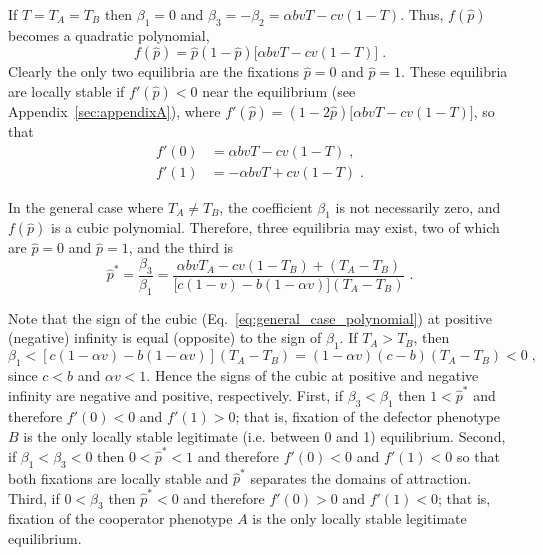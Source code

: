\documentclass[12pt]{extarticle}
\begin{document}
\begin{appendices}
If $T=T_A=T_B$ then $\beta_1=0$ and $\beta_3=-\beta_2=\alpha b vT -cv(1-T)$. 
Thus, $f(\hat{p})$ becomes a quadratic polynomial,
\begin{equation} \label{eq:equal_horizontal_transmission}
  f(\hat{p}) = \hat{p}(1-\hat{p})\big[\alpha bvT - cv(1-T)\big] \;.
\end{equation}
Clearly the only two equilibria are the fixations  $\hat{p} =  0$ and $\hat{p} = 1$.
These equilibria are locally stable if $f'(\hat{p})<0$ near the equilibrium (see Appendix~\autoref{sec:appendixA}), where
$f'(\hat{p})=(1-2\hat{p})\big[\alpha bvT - cv(1-T)\big]$, so that
\begin{equation} \label{eq:derivative_of_phattag-phat}
\begin{aligned}
	f'(0) &=	\alpha bvT - cv(1-T) \;, \\
	f'(1) &=	-\alpha bvT + cv(1-T) \;.
\end{aligned}
\end{equation}

In the general case where $T_A \neq T_B$, the coefficient $\beta_1$ is not necessarily zero, and $f(\hat{p})$ is a cubic polynomial.
Therefore, three equilibria may exist, two of which are
$\hat{p} = 0 $ and $\hat{p} = 1$, and the third is
\begin{equation} \label{eq:general_equilibrium_appendix}
  \hat{p}^* =  
  \frac{\beta_3}{\beta_1} =
  \frac{\alpha bvT_A - cv(1-T_B) + (T_A-T_B)}{\big[c(1-v) - b (1-\alpha v)\big] (T_A-T_B)} \;.
\end{equation}

Note that the sign of the  cubic (Eq.\ \ref{eq:general_case_polynomial}) at positive (negative) infinity is equal (opposite) to the sign of $\beta_1$. 
If $T_A>T_B$, then 
\begin{equation} \label{eq:beta1}
   \beta_1 < [c(1-\alpha v) - b(1-\alpha v)] (T_A-T_B) 
   = (1-\alpha v)(c-b)(T_A-T_B) < 0 \;,
 \end{equation}
since $c<b$ and $\alpha v < 1$. Hence the signs of the cubic at positive and negative infinity are negative and positive, respectively.
First, if $\beta_3<\beta_1$ then 
$1<\hat{p}^*$ and therefore $f'(0)<0$ and $f'(1)>0$; that is, fixation of the defector phenotype $B$ is the only locally stable legitimate (i.e. between 0 and 1) equilibrium.
Second, if $\beta_1<\beta_3<0$ then 
$0<\hat{p}^*<1$ and therefore $f'(0)<0$ and $f'(1)<0$ so that both fixations are locally stable and $\hat{p}^*$ separates the domains of attraction.
Third, if $0<\beta_3$ then 
$\hat{p}^*<0$ and therefore $f'(0)>0$ and $f'(1)<0$; that is, fixation of the cooperator phenotype $A$ is the only locally stable legitimate equilibrium.


\end{appendices}
\end{document}
